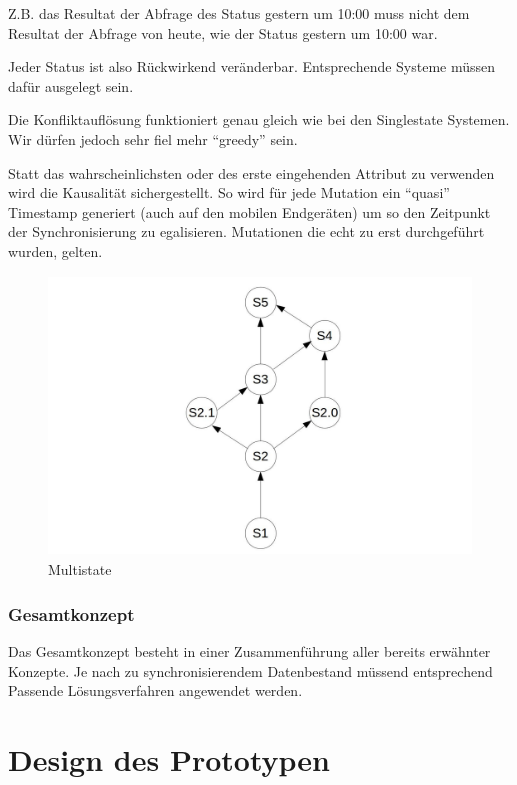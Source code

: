 \documentclass[oneside,11pt,parskip=half,ngerman]{scrreprt}
\makeatletter
\def\maxwidth{\ifdim\Gin@nat@width>\linewidth\linewidth
\else\Gin@nat@width\fi}
\let\Oldincludegraphics\includegraphics
\renewcommand{\includegraphics}[1]{\Oldincludegraphics[width=\maxwidth,height=20em,keepaspectratio]{#1}}
\makeatother
\begin{document}
Z.B. das Resultat der Abfrage des Status gestern um 10:00 muss nicht dem
Resultat der Abfrage von heute, wie der Status gestern um 10:00 war.

Jeder Status ist also Rückwirkend veränderbar. Entsprechende Systeme
müssen dafür ausgelegt sein.

Die Konfliktauflösung funktioniert genau gleich wie bei den Singlestate
Systemen. Wir dürfen jedoch sehr fiel mehr \enquote{greedy} sein.

Statt das wahrscheinlichsten oder des erste eingehenden Attribut zu
verwenden wird die Kausalität sichergestellt. So wird für jede Mutation
ein \enquote{quasi} Timestamp generiert (auch auf den mobilen
Endgeräten) um so den Zeitpunkt der Synchronisierung zu egalisieren.
Mutationen die echt zu erst durchgeführt wurden, gelten.

\begin{figure}[htbp]
\centering
\includegraphics{img/states_01.jpg}
\caption{Multistate}
\end{figure}

\subsection{Gesamtkonzept}\label{gesamtkonzept}

Das Gesamtkonzept besteht in einer Zusammenführung aller bereits
erwähnter Konzepte. Je nach zu synchronisierendem Datenbestand müssend
entsprechend Passende Lösungsverfahren angewendet werden.

\chapter{Design des Prototypen}\label{design-des-prototypen}
\end{document}
